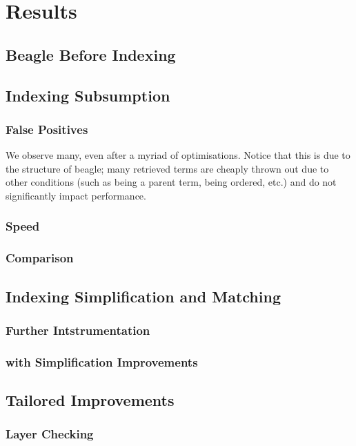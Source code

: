 
\chapter{Results}
\label{cha:results}

\section{Beagle Before Indexing}
\label{sec:preindexing}


\section{Indexing Subsumption}
\label{sec:indexresults}

\subsection{False Positives}

We observe many, even after a myriad of optimisations. Notice
that this is due to the structure of beagle; many retrieved terms
are cheaply thrown out due to other conditions (such as being a parent
term, being ordered, etc.) and do not significantly impact performance.

\subsection{Speed}

\subsection{Comparison}

\section{Indexing Simplification and Matching}
\subsection{Further Intstrumentation}

\subsection{\Beagle with Simplification Improvements}

\section{Tailored Improvements}
\label{sec:tailresults}

\subsection{Layer Checking}



